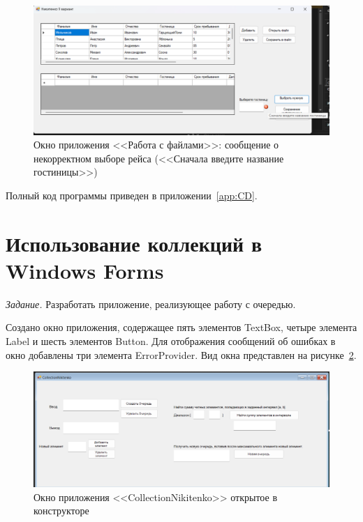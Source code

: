 \documentclass[bachelor, och, pract, times]{SCWorks}
\begin{document}
\begin{figure}[H]
    \centering
    \includegraphics[scale=0.45]{Скрины/Снимок экрана 2025-01-05 142730.png}
    \caption{Окно приложения <<Работа с файлами>>: сообщение о некорректном выборе рейса (<<Сначала введите название гостиницы>>)}\label{fig:file-10}
\end{figure}

Полный код программы приведен в приложении~\ref{app:CD}.

\section{Использование коллекций в Windows Forms}

\textsl{Задание.} Разработать приложение, реализующее работу с очередью\cite{bookc++bern}.

Создано окно приложения, содержащее пять элементов TextBox, четыре элемента Label и шесть элементов Button. Для отображения сообщений об ошибках в окно добавлены три элемента ErrorProvider. Вид окна представлен на рисунке~\ref{fig:queue-01}.

\begin{figure}[H]
    \centering
    \includegraphics[scale=0.5]{Скрины/Снимок экрана 2025-01-05 203620.png}
    \caption{Окно приложения <<CollectionNikitenko>> открытое в конструкторе}\label{fig:queue-01}
\end{figure}
\end{document}
